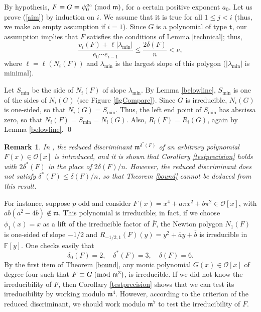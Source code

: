 \documentclass{amsart}
\newtheorem{remark}[theorem]{Remark}
\begin{document}
By hypothesis, $F\equiv G\equiv \psi_0^{a_0}{\; \mbox{\rm(mod }{{\mathfrak m}})}$, for a certain positive exponent $a_0$. Let us prove (\ref{aim}) by induction on $i$. We assume that it is true for all $1\le j<i$ (thus, we make an empty assumption if $i=1$). Since $G$ is a polynomial of type ${\mathbf{t}}$, our assumption implies that $F$ satisfies the conditions of Lemma \ref{technical}; thus, 
\begin{equation}\label{lemma}
\dfrac{v_i(F)+\ell|{\lambda_{\operatorname{min}}}|}{e_0\cdots e_{i-1}}\le \dfrac{2\delta(F)}{n}<\nu,
\end{equation}
where $\ell=\ell(N_i(F))$ and ${\lambda_{\operatorname{min}}}$ is the largest slope of this polygon ($|{\lambda_{\operatorname{min}}}|$ is minimal). 

Let ${S_{\operatorname{min}}}$ be the side of $N_i(F)$ of slope ${\lambda_{\operatorname{min}}}$. By Lemma \ref{belowline}, ${S_{\operatorname{min}}}$ is one of the sides of $N_i(G)$  (see Figure \ref{figCompare}). Since $G$ is irreducible, $N_i(G)$ is one-sided, so that $N_i(G)={S_{\operatorname{min}}}$. Thus, the left end point of ${S_{\operatorname{min}}}$ has abscissa zero, so that $N_i(F)={S_{\operatorname{min}}}=N_i(G)$. Also, $R_i(F)=R_i(G)$, again by Lemma \ref{belowline}.  \qed

\begin{remark}\label{reduced}\rm
In \cite{fpr}, the \emph{reduced discriminant} ${{\mathfrak m}}^{\delta^*(F)}$ of an arbitrary polynomial $F(x)\in{\mathcal{O}}[x]$ is introduced, and it is shown that Corollary \ref{testprecision} holds with $2\delta^*(F)$ in the place of $2\delta(F)/n$. However, the reduced discriminant does not satisfy $\delta^*(F)\le \delta(F)/n$, so that Theorem \ref{bound} cannot be deduced from this result.
\end{remark}

For instance, suppose $p$ odd and consider $F(x)=x^4+a\pi x^2+b\pi^2\in{\mathcal{O}}[x]$, with $ab(a^2-4b)\not\in{{\mathfrak m}}$. This polynomial is irreducible; in fact, if we choose $\phi_1(x)=x$ as a lift of the irreducible factor of $\overline{F}$, the Newton polygon $N_1(F)$ is one-sided of slope $-1/2$ and $R_{-1/2,1}(F)(y)=y^2+\overline{a}y+\overline{b}$ is irreducible in ${\mathbb F}[y]$. One checks easily that 
$$\delta_0(F)=2, \quad \delta^*(F)=3, \quad \delta(F)=6. 
$$
By the first item of Theorem \ref{bound}, any monic polynomial $G(x)\in{\mathcal{O}}[x]$ of degree four such that $F\equiv G{\; \mbox{\rm(mod }{{{{\mathfrak m}}^3}})}$, is irreducible. If we did not know the irreducibility of $F$, then Corollary \ref{testprecision} shows that we can test its irreducibility by working modulo ${{\mathfrak m}}^4$. However, according to the criterion of the reduced discriminant, we should work modulo ${{\mathfrak m}}^7$ to test the irreducibility of $F$.   
\end{document}
